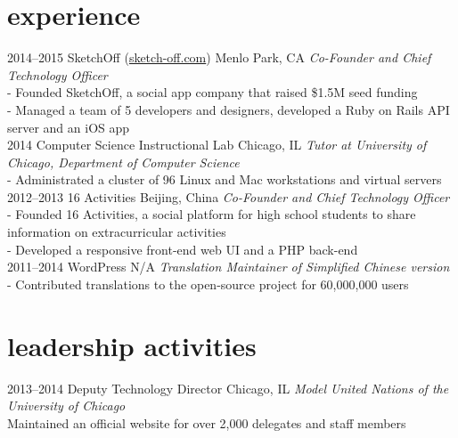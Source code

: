 \section{experience}

\begin{entrylist}
\entry
{2014--2015}
{SketchOff \quad\normalfont (\underline{sketch-off.com})}
{Menlo Park, CA}
{\emph{Co-Founder and Chief Technology Officer} \\
- Founded SketchOff, a social app company that raised \$1.5M seed funding \\
- Managed a team of 5 developers and designers, developed a Ruby on Rails API server and an iOS app \\}
\entry
{2014}
{Computer Science Instructional Lab}
{Chicago, IL}
{\emph{Tutor at University of Chicago, Department of Computer Science} \\
- Administrated a cluster of 96 Linux and Mac workstations and virtual servers\\}
\entry
{2012--2013}
{16 Activities}
{Beijing, China}
{\emph{Co-Founder and Chief Technology Officer} \\
- Founded 16 Activities, a social platform for high school students to share information on extracurricular activities \\
- Developed a responsive front-end web UI and a PHP back-end \\}
\entry
{2011--2014}
{WordPress}
{N/A}
{\emph{Translation Maintainer of Simplified Chinese version} \\
-   Contributed translations to the open-source project for 60,000,000 users \\}
\end{entrylist}

\section{leadership activities}

\begin{entrylist}
\entry
{2013--2014}
{Deputy Technology Director}
{Chicago, IL}
{\emph{Model United Nations of the University of Chicago} \\
Maintained an official website for over 2,000 delegates and staff members \\}
\end{entrylist}

